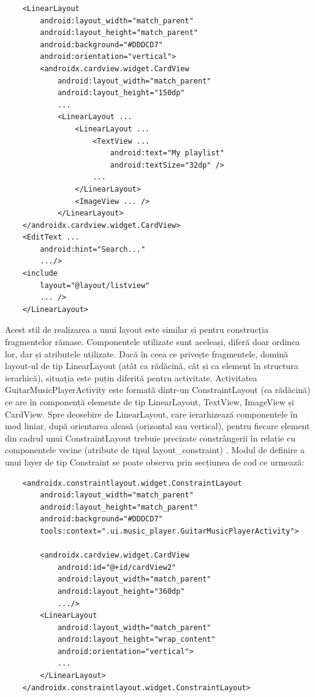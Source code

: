 \documentclass[a4paper,12pt]{report}
\begin{document}
\lstset{language=XML, numbers=none, frame=single, showstringspaces=false}
\begin{lstlisting}
    <LinearLayout
        android:layout_width="match_parent"
        android:layout_height="match_parent"
        android:background="#DDDCD7"
        android:orientation="vertical">
        <androidx.cardview.widget.CardView
            android:layout_width="match_parent"
            android:layout_height="150dp"
            ...
            <LinearLayout ...
                <LinearLayout ...
                    <TextView ...
                        android:text="My playlist"
                        android:textSize="32dp" />
                    ...
                </LinearLayout>
                <ImageView ... />
            </LinearLayout>
    </androidx.cardview.widget.CardView>
    <EditText ...
        android:hint="Search..." 
        .../>
    <include
        layout="@layout/listview"
        ... />
    </LinearLayout>
\end{lstlisting}

Acest stil de realizarea a unui 
layout este similar și pentru construcția fragmentelor 
rămase. Componentele utilizate sunt aceleași, 
diferă doar ordinea lor, dar și atributele utilizate.
Dacă în ceea ce privește fragmentele, domină 
layout-ul de tip LinearLayout (atât ca rădăcină, cât 
și ca element în structura ierarhică), situația este 
puțin diferită pentru activitate. Activitatea 
GuitarMusicPlayerActivity este formată dintr-un 
ConstraintLayout (ca rădăcină) ce are 
în componență elemente de tip LinearLayout, TextView, 
ImageView și CardView. Spre deosebire de
LinearLayout, care ierarhizează componentele 
în mod liniar, după orientarea aleasă 
(orizontal sau vertical), pentru fiecare 
element din cadrul unui ConstraintLayout trebuie 
precizate constrângerii în relație cu 
componentele vecine (atribute de tipul 
layout{\_}constraint) \cite{WEBSITE:android-layouts}. Modul de definire a unui 
layer de tip Constraint se poate observa prin
secțiunea de cod ce urmează:
\lstset{language=XML, numbers=none, frame=single, showstringspaces=false}
\begin{lstlisting}
    <androidx.constraintlayout.widget.ConstraintLayout
        android:layout_width="match_parent"
        android:layout_height="match_parent"
        android:background="#DDDCD7"
        tools:context=".ui.music_player.GuitarMusicPlayerActivity">

        <androidx.cardview.widget.CardView
            android:id="@+id/cardView2"
            android:layout_width="match_parent"
            android:layout_height="360dp"
            .../>
        <LinearLayout
            android:layout_width="match_parent"
            android:layout_height="wrap_content"
            android:orientation="vertical">
            ...
        </LinearLayout>
    </androidx.constraintlayout.widget.ConstraintLayout>
\end{lstlisting}
\fi
\end{document}
